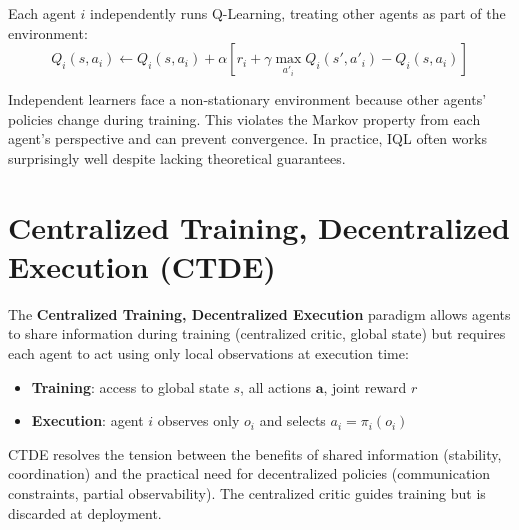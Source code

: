 \begin{definition}
Each agent $i$ independently runs Q-Learning, treating other agents as
part of the environment:
\[
    Q_i(s, a_i) \leftarrow Q_i(s, a_i) + \alpha\left[
    r_i + \gamma \max_{a'_i} Q_i(s', a'_i) - Q_i(s, a_i)\right]
\]
\end{definition}

\begin{attention}[title=\textbf{Non-Stationarity Problem}]
Independent learners face a non-stationary environment because other
agents' policies change during training. This violates the Markov
property from each agent's perspective and can prevent convergence.
In practice, IQL often works surprisingly well despite lacking
theoretical guarantees.
\end{attention}

\section{Centralized Training, Decentralized Execution (CTDE)}
\label{sec:ctde}

\begin{definition}
The \textbf{Centralized Training, Decentralized Execution} paradigm
allows agents to share information during training (centralized critic,
global state) but requires each agent to act using only local observations
at execution time:
\begin{itemize}
    \item \textbf{Training}: access to global state $s$, all actions
    $\mathbf{a}$, joint reward $r$
    \item \textbf{Execution}: agent $i$ observes only $o_i$ and selects
    $a_i = \pi_i(o_i)$
\end{itemize}
\end{definition}

\begin{intuition}
CTDE resolves the tension between the benefits of shared information
(stability, coordination) and the practical need for decentralized
policies (communication constraints, partial observability). The
centralized critic guides training but is discarded at deployment.
\end{intuition}

